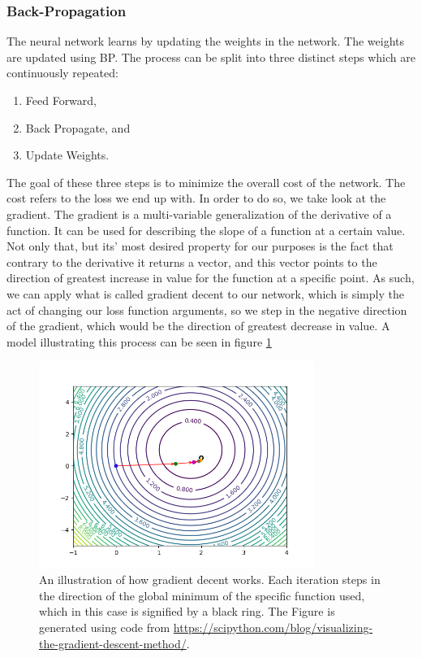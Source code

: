 \subsubsection{Back-Propagation}\label{sec:BP}

The neural network learns by updating the weights in the network. The weights
are updated using \gls{BP}. The process can be split into three distinct steps
which are continuously repeated:

\begin{enumerate}
    \item Feed Forward,
    \item Back Propagate, and
    \item Update Weights.
\end{enumerate}

The goal of these three steps is to minimize the overall cost of the network.
The cost refers to the loss we end up with. In order to do so, we take look at
the gradient. The gradient is a multi-variable generalization of the derivative
of a function. It can be used for describing the slope of a function at a
certain value. Not only that, but its' most desired property for our purposes is
the fact that contrary to the derivative it returns a vector, and this vector
points to the direction of greatest increase in value for the function at a
specific point. As such, we can apply what is called gradient decent to our
network, which is simply the act of changing our loss function arguments, so we
step in the negative direction of the gradient, which would be the direction of
greatest decrease in value. A model illustrating this process can be seen in
figure \ref{fig:grad}

\begin{figure}
    \centering
    \includegraphics[width=0.8\textwidth]{./pictures/method/GradientDesc.png}
    \caption{An illustration of how gradient decent works. Each iteration steps
        in the direction of the global minimum of the specific function used,
        which in this case is signified by a black ring. The Figure is generated
        using code from
        \url{https://scipython.com/blog/visualizing-the-gradient-descent-method/}.}
    \label{fig:grad}
\end{figure}

